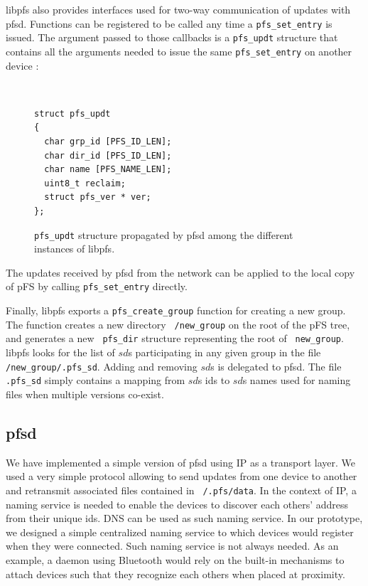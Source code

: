 libpfs also provides interfaces used for two-way communication of
updates with pfsd. Functions can be registered to be called
any time a {\tt pfs\_set\_entry} is issued. The argument passed to
those callbacks is a {\tt pfs\_updt} structure that contains all the
arguments needed to issue the same {\tt pfs\_set\_entry} on another
device :

\begin{figure}[ht]
\begin{center}
{\tt \small
\begin{verbatim}
struct pfs_updt
{
  char grp_id [PFS_ID_LEN];
  char dir_id [PFS_ID_LEN];  
  char name [PFS_NAME_LEN];
  uint8_t reclaim;
  struct pfs_ver * ver;
};
\end{verbatim}
}
\end{center}
\caption{\label{MemStruct}
{\small {\tt pfs\_updt} structure propagated by pfsd among the
    different instances of libpfs.}}
\end{figure}

The updates received by pfsd from the network can be applied to the
local copy of pFS by calling {\tt pfs\_set\_entry} directly.

Finally, libpfs exports a {\tt pfs\_create\_group} function for
creating a new group. The function creates a new directory {\tt
  /new\_group} on the root of the pFS tree, and generates a new {\tt
  pfs\_dir} structure representing the root of {\tt
  new\_group}. libpfs looks for the list of $sd$s participating in any
given group in the file {\tt /new\_group/.pfs\_sd}. Adding and
removing $sd$s is delegated to pfsd. The file {\tt .pfs\_sd} simply
contains a mapping from $sd$s ids to $sd$s names used for naming files
when multiple versions co-exist.

\subsection {pfsd}

We have implemented a simple version of pfsd using IP as a transport
layer. We used a very simple protocol allowing to send updates from
one device to another and retransmit associated files contained in {\tt
  /.pfs/data}. In the context of IP, a naming service is needed to
enable the devices to discover each others' address from
their unique ids. DNS can be used as such naming service. In our
prototype, we designed a simple centralized naming service to which
devices would register when they were connected. Such naming service
is not always needed. As an example, a daemon using Bluetooth
would rely on the built-in mechanisms to attach devices such that they
recognize each others when placed at proximity.

